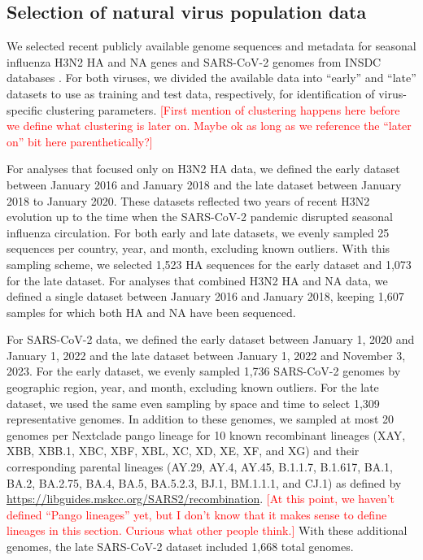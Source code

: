 \documentclass[10pt,letterpaper]{article}
\def\jhc#1{\textcolor{red}{[#1]}}
\begin{document}
\subsection*{Selection of natural virus population data}

We selected recent publicly available genome sequences and metadata for seasonal influenza H3N2 HA and NA genes and SARS-CoV-2 genomes from INSDC databases \cite{Arita2021}.
For both viruses, we divided the available data into ``early'' and ``late'' datasets to use as training and test data, respectively, for identification of virus-specific clustering parameters.
\jhc{First mention of clustering happens here before we define what clustering is later on. Maybe ok as long as we reference the ``later on'' bit here parenthetically?}

For analyses that focused only on H3N2 HA data, we defined the early dataset between January 2016 and January 2018 and the late dataset between January 2018 to January 2020.
These datasets reflected two years of recent H3N2 evolution up to the time when the SARS-CoV-2 pandemic disrupted seasonal influenza circulation.
For both early and late datasets, we evenly sampled 25 sequences per country, year, and month, excluding known outliers.
With this sampling scheme, we selected 1,523 HA sequences for the early dataset and 1,073 for the late dataset.
For analyses that combined H3N2 HA and NA data, we defined a single dataset between January 2016 and January 2018, keeping 1,607 samples for which both HA and NA have been sequenced.

For SARS-CoV-2 data, we defined the early dataset between January 1, 2020 and January 1, 2022 and the late dataset between January 1, 2022 and November 3, 2023.
For the early dataset, we evenly sampled 1,736 SARS-CoV-2 genomes by geographic region, year, and month, excluding known outliers.
For the late dataset, we used the same even sampling by space and time to select 1,309 representative genomes.
In addition to these genomes, we sampled at most 20 genomes per Nextclade pango lineage for 10 known recombinant lineages (XAY, XBB, XBB.1, XBC, XBF, XBL, XC, XD, XE, XF, and XG) and their corresponding parental lineages (AY.29, AY.4, AY.45, B.1.1.7, B.1.617, BA.1, BA.2, BA.2.75, BA.4, BA.5, BA.5.2.3, BJ.1, BM.1.1.1, and CJ.1) as defined by \href{https://libguides.mskcc.org/SARS2/recombination}{https://libguides.mskcc.org/SARS2/recombination}.
\jhc{At this point, we haven't defined ``Pango lineages'' yet, but I don't know that it makes sense to define lineages in this section. Curious what other people think.}
With these additional genomes, the late SARS-CoV-2 dataset included 1,668 total genomes.
\end{document}
